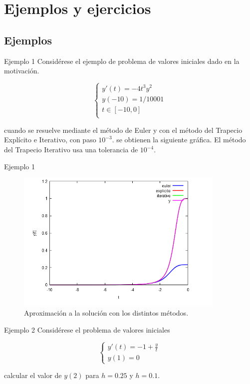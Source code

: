 \section{Ejemplos y ejercicios} \label{ejemplos-ejs}

	\subsection{Ejemplos} \label{ejemplo1}
		\begin{frame}{Ejemplo 1}
			Considérese el ejemplo de problema de valores iniciales dado en la motivación.

			\begin{equation*}
			\begin{cases}
			y'(t) = -4 t^3 y^2 \\
			y(-10) = 1/10001 \\
			t \in [-10,0] \\
			\end{cases}
			\end{equation*}

			cuando se resuelve mediante el método de Euler y con el método del Trapecio Explícito e Iterativo, con paso $10^{-3}$. se obtienen la siguiente gráfica. El método del Trapecio Iterativo usa una tolerancia de $10^{-4}$.
		\end{frame}


		\begin{frame}{Ejemplo 1}	
			\begin{figure}[h]
				\centering
				\includegraphics[width=10cm]{./Images/ej1.png}
				\caption{Aproximación a la solución con los distintos métodos.}
			\end{figure}
		\end{frame}	
		
		
		\begin{frame}{Ejemplo 2}
			Considérese el problema de valores iniciales
			
			\begin{equation*}
			\begin{cases}
			y'(t) = -1 + \frac{y}{t} \\
			y(1) = 0
			\end{cases}
			\end{equation*}
			
			calcular el valor de $y(2)$ para $h=0.25$ y $h=0.1$.			
		\end{frame}
		
